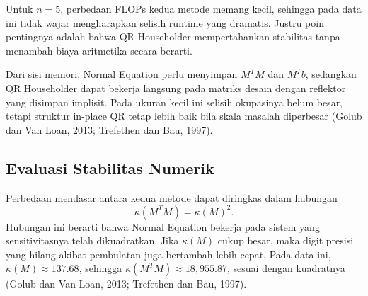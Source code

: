 \documentclass[12pt,a4paper]{article}
\begin{document}
Untuk \(n=5\), perbedaan FLOPs kedua metode memang kecil, sehingga pada data ini tidak wajar mengharapkan selisih runtime yang dramatis. Justru poin pentingnya adalah bahwa QR Householder mempertahankan stabilitas tanpa menambah biaya aritmetika secara berarti.

Dari sisi memori, Normal Equation perlu menyimpan \(M^TM\) dan \(M^Tb\), sedangkan QR Householder dapat bekerja langsung pada matriks desain dengan reflektor yang disimpan implisit. Pada ukuran kecil ini selisih okupasinya belum besar, tetapi struktur in-place QR tetap lebih baik bila skala masalah diperbesar (Golub dan Van Loan, 2013; Trefethen dan Bau, 1997).

\begin{table}[H]
\centering
\caption{Perbandingan FLOPs dan okupasi memori antara Normal Equation dan QR Householder.}
\label{tab:star-complexity}
\end{table}

\subsection{Evaluasi Stabilitas Numerik}
Perbedaan mendasar antara kedua metode dapat diringkas dalam hubungan
\[
\kappa(M^TM)=\kappa(M)^2.
\]
Hubungan ini berarti bahwa Normal Equation bekerja pada sistem yang sensitivitasnya telah dikuadratkan. Jika \(\kappa(M)\) cukup besar, maka digit presisi yang hilang akibat pembulatan juga bertambah lebih cepat. Pada data ini, \(\kappa(M)\approx 137.68\), sehingga \(\kappa(M^TM)\approx 18{,}955.87\), sesuai dengan kuadratnya (Golub dan Van Loan, 2013; Trefethen dan Bau, 1997).
\end{document}
